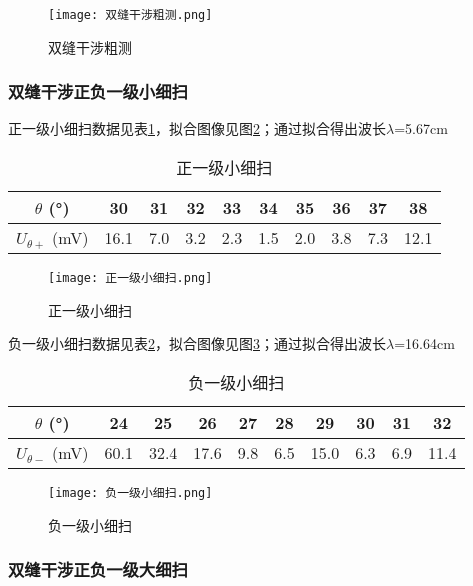 \documentclass[11pt]{article}
\begin{document}
	\begin{figure}[h!]
		\centering
		\texttt{[image: 双缝干涉粗测.png]}
		\caption{双缝干涉粗测}
		\label{fig:double slit general}
	\end{figure}
	

	\subsubsection{双缝干涉正负一级小细扫}
	
	正一级小细扫数据见表\ref{tab:正一级小细扫}，拟合图像见图\ref{fig:正一级小细扫}；通过拟合得出波长$\lambda$=5.67cm
	\begin{table}[h!]
		\centering
		\begin{tabular}{|c|c|c|c|c|c|c|c|c|c|}
			\hline
			$\theta$ (°) & 30 & 31 & 32 & 33 & 34 & 35 & 36 & 37 & 38 \\ \hline
			$U_{\theta+}$ (mV) & 16.1 & 7.0 & 3.2 & 2.3 & 1.5 & 2.0 & 3.8 & 7.3 & 12.1 \\ \hline
		\end{tabular}
		\caption{正一级小细扫}
		\label{tab:正一级小细扫}
	\end{table}
	
	\begin{figure}[h!]
		\centering
		\texttt{[image: 正一级小细扫.png]}
		\caption{正一级小细扫}
		\label{fig:正一级小细扫}
	\end{figure}
	
	负一级小细扫数据见表\ref{tab:负一级小细扫}，拟合图像见图\ref{fig:负一级小细扫}；通过拟合得出波长$\lambda$=16.64cm
				
	\begin{table}[h!]
		\centering
		\begin{tabular}{|c|c|c|c|c|c|c|c|c|c|}
			\hline
			$\theta$ (°) & 24 & 25 & 26 & 27 & 28 & 29 & 30 & 31 & 32 \\ \hline
			$U_{\theta-}$ (mV) & 60.1 & 32.4 & 17.6 & 9.8 & 6.5 & 15.0 & 6.3 & 6.9 & 11.4 \\ \hline
		\end{tabular}
		\caption{负一级小细扫}
		\label{tab:负一级小细扫}
	\end{table}
	
	\begin{figure}[h!]
		\centering
		\texttt{[image: 负一级小细扫.png]}
		\caption{负一级小细扫}
		\label{fig:负一级小细扫}
	\end{figure}
	
	
	\subsubsection{双缝干涉正负一级大细扫}
	
\end{document}

